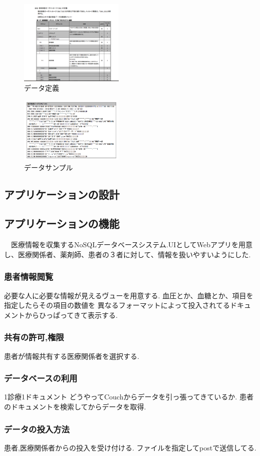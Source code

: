 	
	
	\begin{figure}[htbp]
		\begin{center}
			\includegraphics[width=5cm, bb=0 0 645 790]{ss-mix_sample.png} %
		\end{center}
		\caption{データ定義}
		\label{ss-mix_sample}
	\end{figure}

	\begin{figure}[htbp]
		\begin{center}
			\includegraphics[width=5cm, bb=0 0 437 688]{ss-mix_sampledata.png}
		\end{center}
		\caption{データサンプル}
		\label{ss-mix_sampledata}
	\end{figure}

\subsection{アプリケーションの設計}


\subsection{アプリケーションの機能}
　医療情報を収集するNoSQLデータベースシステム.UIとしてWebアプリを用意し、医療関係者、薬剤師、患者の３者に対して、情報を扱いやすいようにした.

	\subsubsection{患者情報閲覧}
		必要な人に必要な情報が見えるヴューを用意する.
		血圧とか、血糖とか、項目を指定したらその項目の数値を
		異なるフォーマットによって投入されてるドキュメントからひっぱってきて表示する.

	\subsubsection{共有の許可,権限}
		患者が情報共有する医療関係者を選択する.

	\subsubsection{データベースの利用}
		1診療1ドキュメント
		どうやってCouchからデータを引っ張ってきているか.
		患者のドキュメントを検索してからデータを取得.

	\subsubsection{データの投入方法}
		 患者,医療関係者からの投入を受け付ける.
		 ファイルを指定してpostで送信してる.
